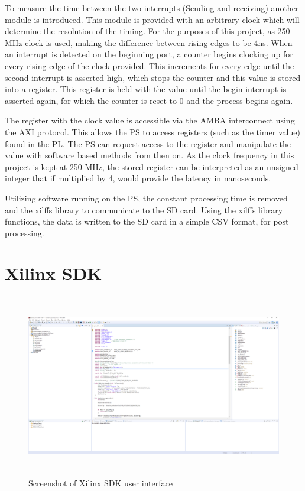 To measure the time between the two interrupts (Sending and receiving) another module is introduced. This module is 
provided with an arbitrary clock which will determine the resolution of the timing. For the purposes of this project,
as 250 MHz clock is used, making the difference between rising edges to be 4ns. When an interrupt is detected on 
the beginning port, a counter begins clocking up for every rising edge of the clock provided. This increments for 
every edge until the second interrupt is asserted high, which stops the counter and this value is stored into a 
register. This register is held with the value until the begin interrupt is asserted again, for which the counter is 
reset to 0 and the process begins again.

The register with the clock value is accessible via the AMBA interconnect using the AXI protocol. This allows the PS 
to access registers (such as the timer value) found in the PL. The PS can request access to the register and 
manipulate the value with software based methods from then on. As the clock frequency in this project is kept at 250 
MHz, the stored register can be interpreted as an unsigned integer that if multiplied by 4, would provide the latency 
in nanoseconds. 

Utilizing software running on the PS, the constant processing time is removed and the xilffs library to communicate 
to the SD card. Using the xilffs library functions, the data is written to the SD card in a simple CSV format, for 
post processing.

\section{Xilinx SDK}

\begin{figure}[H]
    \begin{center}
        \includegraphics[height=8cm,keepaspectratio]{Images/SDK.png}
        \caption{Screenshot of Xilinx SDK user interface}
        \label{fig:SDK}
    \end{center}
\end{figure}

